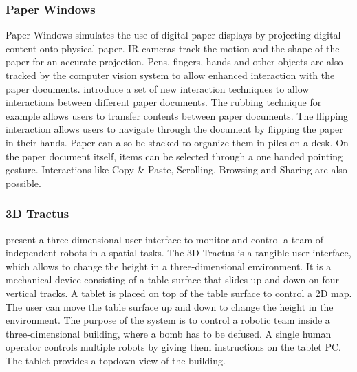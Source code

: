 \subsubsection{Paper Windows}
Paper Windows simulates the use of digital paper displays by projecting digital content onto physical paper. IR cameras track the motion and the shape of the paper for an accurate projection. Pens, fingers, hands and other objects are also tracked by the computer vision system to allow enhanced interaction with the paper documents. \cite{holman05} introduce a set of new interaction techniques to allow interactions between different paper documents. The rubbing technique for example allows users to transfer contents between paper documents. The flipping interaction allows users to navigate through the document by flipping the paper in their hands. Paper can also be stacked to organize them in piles on a desk. On the paper document itself, items can be selected through a one handed pointing gesture. Interactions like Copy \& Paste, Scrolling, Browsing and Sharing are also possible. 

\subsubsection{3D Tractus}
\cite{lapides00} present a three-dimensional user interface to monitor and control a team of independent robots in a spatial tasks. The 3D Tractus is a tangible user interface, which allows to change the height in a three-dimensional environment. It is a mechanical device consisting of a table surface that slides up and down on four vertical tracks. A tablet is placed on top of the table surface to control a 2D map. The user can move the table surface up and down to change the height in the environment. The purpose of the system is to control a robotic team inside a three-dimensional building, where a bomb has to be defused. A single human operator controls multiple robots by giving them instructions on the tablet PC. The tablet provides a topdown view of the building. 